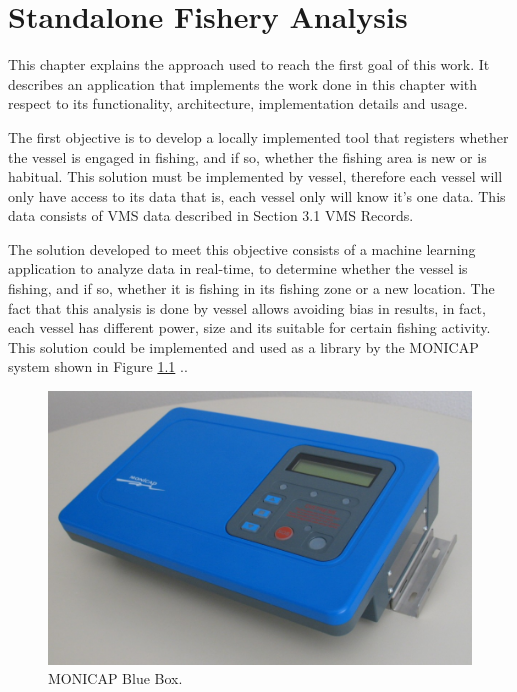 % 
%  
%
\chapter{Standalone Fishery Analysis}
\label{cha:standalone_fishery_analysis}
This chapter explains the approach used to reach the first goal of this work. It describes an application that implements the work done in this chapter with respect to its functionality, architecture, implementation details and usage.  


The first objective is to develop a locally implemented tool that registers whether the vessel is engaged in fishing, and if so, whether the fishing area is new or is habitual. This solution must be implemented by vessel, therefore each vessel will only have access to its data that is, each vessel only will know it’s one data. This data consists of VMS data described in Section 3.1 VMS Records.

The solution developed to meet this objective consists of a machine learning application to analyze data in real-time, to determine whether the vessel is fishing, and if so, whether it is fishing in its fishing zone or a new location.
The fact that this analysis is done by vessel allows avoiding bias in results, in fact, each vessel has different power, size and its suitable for certain fishing activity.\\
This solution could be implemented and used as a library by the MONICAP system shown in Figure \ref{fig:monicap} .\cite{WEBSITE:MonicapXsealence}.

\begin{figure}[H]
    \centering
    \includegraphics[width=0.8\linewidth]{Chapters/img/equipamento_monicap.png}
    \caption{MONICAP Blue Box.}
    \label{fig:monicap}
\end{figure}

